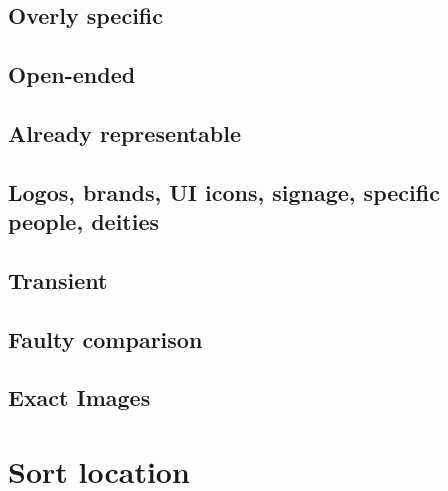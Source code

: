 \documentclass{article}
\begin{document}
\subsection{Overly specific}
\subsection{Open-ended}
\subsection{Already representable}
\subsection{Logos, brands, UI icons, signage, specific people, deities}
\subsection{Transient}
\subsection{Faulty comparison}
\subsection{Exact Images}

\section{Sort location}
\end{document}
